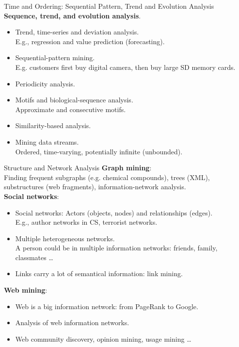 \begin{frame}{Time and Ordering: Sequential Pattern, Trend and Evolution 
Analysis}
	\textbf{Sequence, trend, and evolution analysis}.\\
	\begin{itemize}
		\item Trend, time-series and deviation analysis. \\
		E.g., regression and value prediction (forecasting).
		\item Sequential-pattern mining.\\
		E.g. customers first buy digital camera, then buy large SD memory cards.
		\item Periodicity analysis.
		\item Motifs and biological-sequence analysis.\\
		Approximate and consecutive motifs.
		\item Similarity-based analysis.\\
		\item Mining data streams.\\
		Ordered, time-varying, potentially infinite (unbounded).
	\end{itemize}
\end{frame}

\begin{frame}{Structure and Network Analysis}
	\textbf{Graph mining}:\\
	Finding frequent subgraphs (e.g. chemical compounds), trees (XML), 
	substructures (web fragments), information-network analysis.\\[0.2cm]
	
	\textbf{Social networks}:
	\begin{itemize}
		\item Social networks: Actors (objects, nodes) and relationships 
		(edges).\\
		E.g., author networks in CS, terrorist networks.
		\item Multiple heterogeneous networks.\\
		A person could be in multiple information networks: friends, family, 
		classmates \ldots
		\item Links carry a lot of semantical information: link mining.
	\end{itemize}
	
	\textbf{Web mining}:
	\begin{itemize}
		\item Web is a big information network: from PageRank to Google.
		\item Analysis of web information networks.
		\item Web community discovery, opinion mining, usage mining \ldots
	\end{itemize}
\end{frame}

